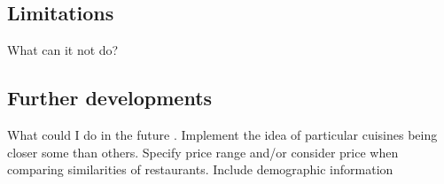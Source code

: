 \documentclass[conference]{IEEEtran}
\begin{document}
\subsection{Limitations}
What can it not do?

\subsection{Further developments}
What could I do in the future \cite{5284958}. 
Implement the idea of particular cuisines being closer some than others. 
Specify price range and/or consider price when comparing similarities of restaurants. 
Include demographic information




\end{document}
